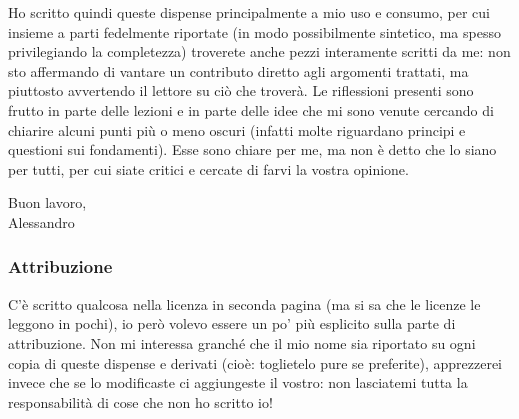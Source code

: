 Ho scritto quindi queste dispense principalmente a mio uso e consumo, per cui insieme a parti fedelmente riportate (in modo possibilmente sintetico, ma spesso privilegiando la completezza) troverete anche pezzi interamente scritti da me: non sto affermando di vantare un contributo diretto agli argomenti trattati, ma piuttosto avvertendo il lettore su ciò che troverà. Le riflessioni presenti sono frutto in parte delle lezioni e in parte delle idee che mi sono venute cercando di chiarire alcuni punti più o meno oscuri (infatti molte riguardano principi e questioni sui fondamenti). Esse sono chiare per me, ma non è detto che lo siano per tutti, per cui siate critici e cercate di farvi la vostra opinione.

\begin{flushright}
	Buon lavoro,\\
	Alessandro
\end{flushright}

\subsubsection*{Attribuzione}
C'è scritto qualcosa nella licenza in seconda pagina (ma si sa che le licenze le leggono in pochi), io però volevo essere un po' più esplicito sulla parte di attribuzione. Non mi interessa granché che il mio nome sia riportato su ogni copia di queste dispense e derivati (cioè: toglietelo pure se preferite), apprezzerei invece che se lo modificaste ci aggiungeste il vostro: non lasciatemi tutta la responsabilità di cose che non ho scritto io!

\makeatletter\@openrighttrue\makeatother